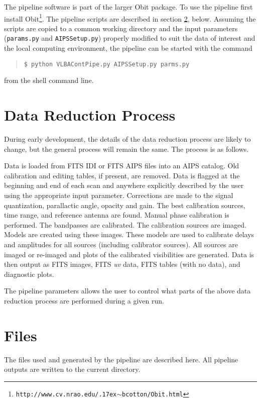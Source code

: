 \documentclass[10pt,onecolumn,final]{IEEEtran}
\renewcommand{\tilde}{\raise.17ex\hbox{$\scriptstyle\mathtt{\sim}$}}
\begin{document}
The pipeline software is part of the larger Obit package\cite{Cotton:Obit}.  To use the pipeline first install Obit\footnote{\tt http://www.cv.nrao.edu/{\tilde}bcotton/Obit.html}.  The pipeline scripts are described in section \ref{files}, below.  Assuming the scripts are copied to a common working directory and the input parameters ({\tt params.py} and {\tt AIPSSetup.py}) properly modified to suit the data of interest and the local computing environment, the pipeline can be started with the command
\begin{quote}\tt \$ python VLBAContPipe.py AIPSSetup.py parms.py\end{quote}
from the shell command line.

\section{Data Reduction Process}

During early development, the details of the data reduction process are likely to change, but the general process will remain the same.  The process is as follows.

Data is loaded from FITS IDI or FITS AIPS files into an AIPS catalog.  Old calibration and editing tables, if present, are removed.  Data is flagged at the beginning and end of each scan and anywhere explicitly described by the user using the appropriate input parameter.  Corrections are made to the signal quantization, parallactic angle, opacity and gain.  The best calibration sources, time range, and reference antenna are found.  Manual phase calibration is performed.  The bandpasses are calibrated.  The calibration sources are imaged.  Models are created using these images.  These models are used to calibrate delays and amplitudes for all sources (including calibrator sources).  All sources are imaged or re-imaged and  plots of the calibrated visibilities are generated.  Data is then output as FITS images, FITS {\em uv} data, FITS tables (with no data), and diagnostic plots.

The pipeline parameters allows the user to control what parts of the above data reduction process are performed during a given run. 

\section{Files} \label{files}

The files used and generated by the pipeline are described here.  All pipeline outputs are written to the current directory.
\end{document}
